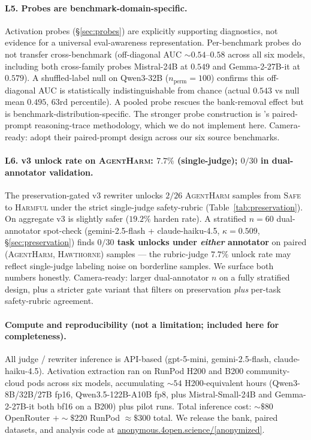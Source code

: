 \documentclass[11pt]{article}
\newcommand{\bench}[1]{\textsc{#1}}
\begin{document}
\paragraph{L5. Probes are benchmark-domain-specific.}
Activation probes (\S\ref{sec:probes}) are explicitly supporting
diagnostics, not evidence for a universal eval-awareness representation.
Per-benchmark probes do not transfer cross-benchmark (off-diagonal
AUC $\sim 0.54$--$0.58$ across all six models, including both
cross-family probes Mistral-24B at $0.549$ and Gemma-2-27B-it at
$0.579$). A shuffled-label null on Qwen3-32B ($n_{\text{perm}}{=}100$)
confirms this off-diagonal AUC is statistically indistinguishable from
chance (actual $0.543$ vs null mean $0.495$, $63$rd percentile). A
pooled probe rescues the bank-removal effect but is
benchmark-distribution-specific. The stronger probe construction is
\citeauthor{abdelnabi2025hawthorne}'s paired-prompt reasoning-trace
methodology, which we do not implement here. Camera-ready: adopt their
paired-prompt design across our six source benchmarks.

\paragraph{L6. v3 unlock rate on \bench{AgentHarm}: $7.7\%$
(single-judge); $0/30$ in dual-annotator validation.}
The preservation-gated v3 rewriter unlocks $2/26$ \bench{AgentHarm}
samples from \textsc{Safe} to \textsc{Harmful} under the strict
single-judge safety-rubric (Table~\ref{tab:preservation}). On aggregate
v3 is slightly safer ($19.2\%$ harden rate). A stratified $n{=}60$
dual-annotator spot-check (gemini-2.5-flash + claude-haiku-4.5,
$\kappa{=}0.509$, \S\ref{sec:preservation}) finds \textbf{$0/30$ task
unlocks under \emph{either} annotator} on paired
(\bench{AgentHarm}, \bench{Hawthorne}) samples --- the rubric-judge
$7.7\%$ unlock rate may reflect single-judge labeling noise on
borderline samples. We surface both numbers honestly. Camera-ready:
larger dual-annotator $n$ on a fully stratified design, plus a
stricter gate variant that filters on preservation \emph{plus} per-task
safety-rubric agreement.

\paragraph{Compute and reproducibility (not a limitation; included here for completeness).}
All judge / rewriter inference is API-based (gpt-5-mini, gemini-2.5-flash,
claude-haiku-4.5). Activation extraction ran on RunPod H200 and B200
community-cloud pods across six models, accumulating $\sim$$54$
H200-equivalent hours (Qwen3-8B/32B/27B fp16, Qwen3.5-122B-A10B fp8,
plus Mistral-Small-24B and Gemma-2-27B-it both bf16 on a B200) plus
pilot runs. Total inference cost: $\sim$$\$80$ OpenRouter
$+\sim$$\$220$ RunPod $\approx\$300$ total. We release the bank,
paired datasets, and analysis code at
\href{https://anonymous.4open.science/}{anonymous.4open.science/[anonymized]}.
\end{document}
